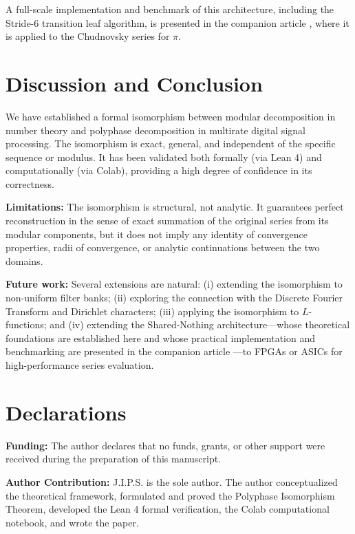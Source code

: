 \documentclass{mcom-l} %
\theoremstyle{plain} %
\theoremstyle{definition} %
\theoremstyle{remark} %
\begin{document}
A full-scale implementation and benchmark of this architecture, including the Stride-6 transition leaf algorithm, is presented in the companion article \cite{peinador_modular}, where it is applied to the Chudnovsky series for \(\pi\).

\section{Discussion and Conclusion}
\label{sec:conclusion}

We have established a formal isomorphism between modular decomposition in number theory and polyphase decomposition in multirate digital signal processing. The isomorphism is exact, general, and independent of the specific sequence or modulus. It has been validated both formally (via Lean 4) and computationally (via Colab), providing a high degree of confidence in its correctness.

\textbf{Limitations:} The isomorphism is structural, not analytic. It guarantees perfect reconstruction in the sense of exact summation of the original series from its modular components, but it does not imply any identity of convergence properties, radii of convergence, or analytic continuations between the two domains.

\textbf{Future work:} Several extensions are natural: (i) extending the isomorphism to non-uniform filter banks; (ii) exploring the connection with the Discrete Fourier Transform and Dirichlet characters; (iii) applying the isomorphism to \(L\)-functions; and (iv) extending the Shared-Nothing architecture---whose theoretical foundations are established here and whose practical implementation and benchmarking are presented in the companion article \cite{peinador_modular}---to FPGAs or ASICs for high-performance series evaluation.

\section*{Declarations}

\textbf{Funding:} The author declares that no funds, grants, or other support were received during the preparation of this manuscript.

\vspace{0.5em}
\noindent\textbf{Author Contribution:} J.I.P.S. is the sole author. The author conceptualized the theoretical framework, formulated and proved the Polyphase Isomorphism Theorem, developed the Lean 4 formal verification, the Colab computational notebook, and wrote the paper.
\end{document}
